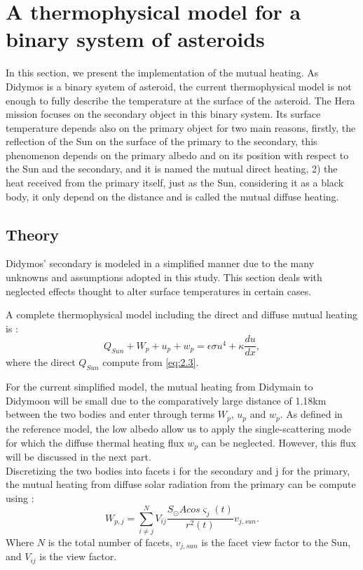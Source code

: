 \section{A thermophysical model for a binary system of asteroids}
\label{mutual}

In this section, we present the implementation of the mutual heating. As Didymos is a binary system of asteroid, the current thermophysical model is not enough to fully describe the temperature at the surface of the asteroid. The Hera mission focuses on the secondary object in this binary system. Its surface temperature depends also on the primary object for two main reasons, firstly, the reflection of the Sun on the surface of the primary to the secondary, this phenomenon depends on the primary albedo and on its position with respect to the Sun and the secondary, and it is named the mutual direct heating, 2) the heat received from the primary itself, just as the Sun, considering it as a black body, it only depend on the distance and is called the mutual diffuse heating.

\subsection{Theory}

Didymos’ secondary is modeled in a simplified manner due to the many unknowns and assumptions adopted in this study. This section deals with neglected effects thought to alter surface temperatures in certain cases.

A complete thermophysical model including the direct and diffuse mutual heating is \cite{pelivan}:
\begin{equation}
    Q_{Sun} + W_p + u_p + w_p = \epsilon \sigma u^4 + \kappa \frac{du}{dx},
    \label{eq 41}
\end{equation}
where the direct $Q_{Sun}$ compute from \autoref{eq:2.3}.

For the current simplified model, the mutual heating from Didymain to Didymoon will be small due to the comparatively large distance of 1.18km \cite{Model} between the two bodies and enter through terms $W_p$, $u_p$ and $w_p$. As defined in the reference model, the low albedo allow us to apply the single-scattering mode for which the diffuse thermal heating flux $w_p$ can be neglected. However, this flux will be discussed in the next part.\\

Discretizing the two bodies into facets i for the secondary and j for the primary, the mutual heating from diffuse solar radiation from the primary can be compute using :
\begin{equation}
    W_{p,j} = \sum_{i \neq j}^N V_{ij} \frac{S_{\odot} A cos \varsigma _j (t)}{r^2 (t)} v_{j,sun}.
    \label{eq 42}
\end{equation}
Where $N$ is the total number of facets, $v_{j,sun}$ is the facet view factor to the Sun, and $V_{ij}$ is the view factor.\\

